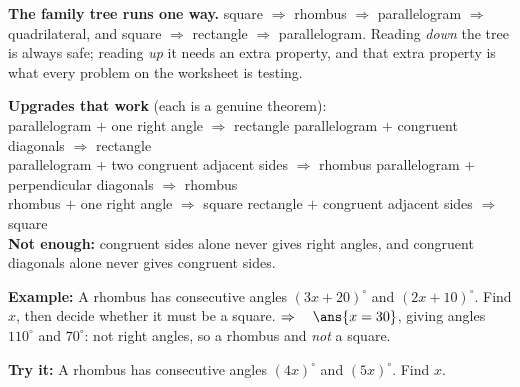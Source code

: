 \documentclass[12pt]{article}
\begin{document}

\noindent\small\textbf{The family tree runs one way.} square $\Rightarrow$ rhombus $\Rightarrow$
parallelogram $\Rightarrow$ quadrilateral, and square $\Rightarrow$ rectangle $\Rightarrow$
parallelogram. Reading \emph{down} the tree is always safe; reading \emph{up} it needs an extra
property, and that extra property is what every problem on the worksheet is testing.\normalsize


\begin{formulabox}
\textbf{Upgrades that work} (each is a genuine theorem):\\[3pt]
parallelogram $+$ one right angle $\Rightarrow$ rectangle \qquad
parallelogram $+$ congruent diagonals $\Rightarrow$ rectangle\\[2pt]
parallelogram $+$ two congruent adjacent sides $\Rightarrow$ rhombus \qquad
parallelogram $+$ perpendicular diagonals $\Rightarrow$ rhombus\\[2pt]
rhombus $+$ one right angle $\Rightarrow$ square \qquad rectangle $+$ congruent adjacent sides
$\Rightarrow$ square\\[3pt]
\textbf{Not enough:} congruent sides alone never gives right angles, and congruent diagonals alone
never gives congruent sides.
\end{formulabox}

\begin{examplebox}
\textbf{Example:} A rhombus has consecutive angles $(3x + 20)^\circ$ and $(2x + 10)^\circ$. Find
$x$, then decide whether it must be a square.
$\Rightarrow\quad \ans{x = 30}$, giving angles $110^\circ$ and $70^\circ$: not right angles, so a
rhombus and \emph{not} a square.
\end{examplebox}

\begin{tryitbox}
\textbf{Try it:} A rhombus has consecutive angles $(4x)^\circ$ and $(5x)^\circ$. Find $x$.\\[2pt]
\end{tryitbox}

\end{document}
